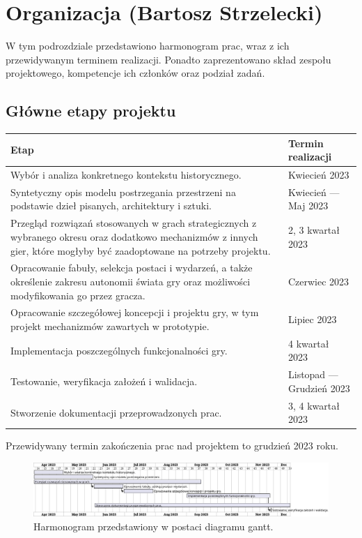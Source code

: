 \section{Organizacja (Bartosz Strzelecki)}
W tym podrozdziale przedstawiono harmonogram prac, wraz z ich przewidywanym terminem realizacji.
Ponadto zaprezentowano skład zespołu projektowego, kompetencje ich członków oraz podział zadań.
\subsection{Główne etapy projektu}
\begin{center}
  \begin{tabular}{| m{30em} | m{12em}|} 
  \hline
  Etap & Termin realizacji \\
  \hline\hline
  Wybór i analiza konkretnego kontekstu historycznego. & Kwiecień 2023 \\
  \hline
  Syntetyczny opis modelu postrzegania przestrzeni na podstawie dzieł pisanych, architektury i sztuki. & Kwiecień — Maj 2023 \\
  \hline
  Przegląd rozwiązań stosowanych w grach strategicznych z wybranego okresu oraz dodatkowo mechanizmów z innych gier, które mogłyby być zaadoptowane na potrzeby projektu. & 2, 3 kwartał 2023 \\
  \hline
  Opracowanie fabuły, selekcja postaci i wydarzeń, a także określenie zakresu autonomii świata gry oraz możliwości modyfikowania go przez gracza. & Czerwiec 2023 \\
  \hline
  Opracowanie szczegółowej koncepcji i projektu gry, w tym projekt mechanizmów zawartych w prototypie. & Lipiec 2023 \\
  \hline
  Implementacja poszczególnych funkcjonalności gry. & 4 kwartał 2023 \\ 
  \hline
  Testowanie, weryfikacja założeń i walidacja. & Listopad — Grudzień 2023 \\
  \hline
  Stworzenie dokumentacji przeprowadzonych prac. & 3, 4 kwartał 2023 \\
  \hline
\end{tabular}
\end{center}
Przewidywany termin zakończenia prac nad projektem to grudzień 2023 roku.
\begin{figure}[htbp]
    \centering
    \includegraphics[width=1\textwidth]{uml/Harmonogram}
    \caption{Harmonogram przedstawiony w postaci diagramu gantt.}
\end{figure}
